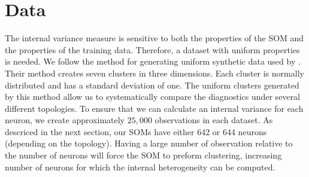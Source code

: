 \section{Data}
\label{meth:data}
The internal variance measure is sensitive to both the properties of the SOM
and the properties of the training data. Therefore, a dataset with uniform
properties is needed. We follow the method for generating uniform synthetic
data used by \cite{wu2006}.  Their method creates seven clusters in three
dimensions.  Each cluster is normally distributed and has a standard deviation
of one.  The uniform clusters generated by this method allow us to
systematically compare the diagnostics under several different topologies.  To
ensure that we can calculate an internal variance for each neuron, we create
approximately $25,000$ observations in each dataset.  As descriced in the next
section, our SOMs have either 642 or 644 neurons (depending on the topology).
Having a large number of observation relative to the number of neurons will
force the SOM to preform clustering, increasing number of neurons for which
the internal heterogeneity can be computed.








